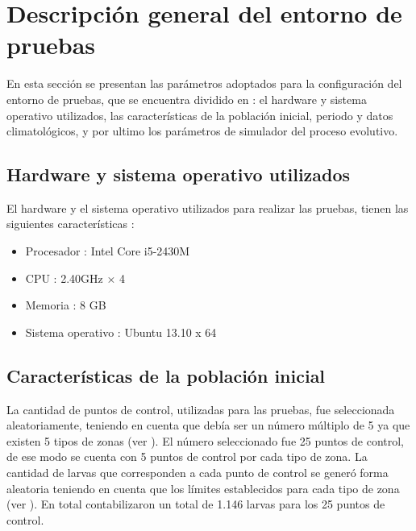 \section{Descripción general del entorno de pruebas}
En esta sección se presentan las parámetros adoptados para la configuración del entorno de
pruebas, que se encuentra dividido en : el hardware y sistema operativo utilizados, las
características de la población inicial, periodo y datos climatológicos, y por ultimo los
parámetros de simulador del proceso evolutivo.

\subsection{Hardware y sistema operativo utilizados}
El hardware y el sistema operativo utilizados para realizar las pruebas, tienen las siguientes
características :
\begin{itemize}
    \item Procesador : Intel Core i5-2430M
    \item CPU : 2.40GHz × 4
    \item Memoria : 8 GB
    \item Sistema operativo : Ubuntu 13.10 x 64
\end{itemize}

\subsection{Características de la población inicial}
La cantidad de puntos de control, utilizadas para las pruebas, fue seleccionada aleatoriamente,
teniendo en cuenta que debía ser un número múltiplo de 5 ya que existen 5 tipos de zonas
(ver ). El número seleccionado fue 25 puntos de control, de ese
modo se cuenta con 5 puntos de control por cada tipo de zona. La cantidad de larvas que
corresponden a cada punto de control se generó forma aleatoria teniendo en cuenta que los límites
establecidos para cada tipo de zona (ver ). En total contabilizaron
un total de 1.146 larvas para los 25 puntos de control.

